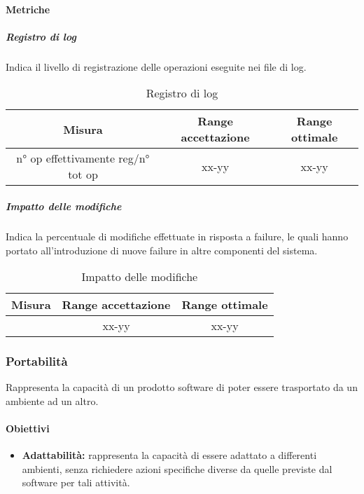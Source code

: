 		\paragraph{Metriche}
			\subparagraph{Registro di log}
			Indica il livello di registrazione delle operazioni eseguite nei file di log.
				\begin{table}[H]
				\begin{center}
					\begin{tabular}{|c|c|c|}
						\hline
						\textbf{Misura} & \textbf{Range accettazione} & \textbf{Range ottimale} \\
						\hline
						n° op effettivamente reg/n° tot op & xx-yy  & xx-yy \\
						\hline
					\end{tabular}
				\end{center}
				\caption{Registro di log}
			\end{table}
			
			\subparagraph{Impatto delle modifiche}
			Indica la percentuale di modifiche effettuate in risposta a failure, le quali hanno portato all’introduzione di nuove failure in altre componenti del sistema.
			\begin{table}[H]
				\begin{center}
					\begin{tabular}{|c|c|c|}
						\hline
						\textbf{Misura} & \textbf{Range accettazione} & \textbf{Range ottimale} \\
						\hline
						 & xx-yy  & xx-yy \\
						\hline
					\end{tabular}
				\end{center}
				\caption{Impatto delle modifiche}
			\end{table}
	
	\subsubsection{Portabilità}
	Rappresenta la capacità di un prodotto software di poter essere trasportato da un ambiente ad un altro.
		
		\paragraph{Obiettivi}
			\begin{itemize}
				\item \textbf{Adattabilità:} rappresenta la capacità di essere adattato a differenti ambienti, senza richiedere azioni specifiche diverse da quelle previste dal software per tali attività.
			\end{itemize}
		
